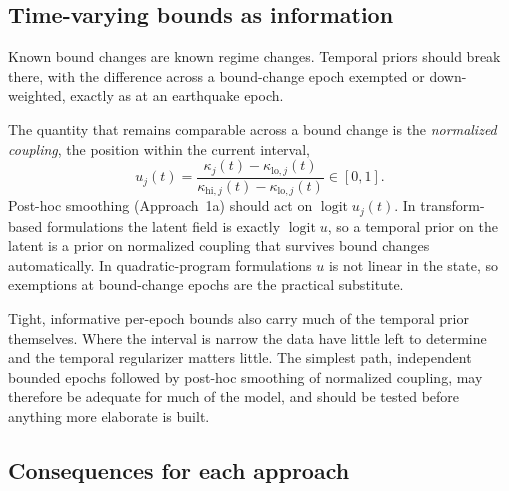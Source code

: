 \documentclass[11pt]{article}
\DeclareMathOperator{\logit}{logit}
\begin{document}
\subsection{Time-varying bounds as information}

Known bound changes are known regime changes. Temporal priors should break there, with the difference across a bound-change epoch exempted or down-weighted, exactly as at an earthquake epoch.

The quantity that remains comparable across a bound change is the \emph{normalized coupling}, the position within the current interval,
\begin{equation}
u_j(t) = \frac{\kappa_j(t) - \kappa_{\mathrm{lo},j}(t)}{\kappa_{\mathrm{hi},j}(t) - \kappa_{\mathrm{lo},j}(t)} \in [0,1].
\label{eq:normalized}
\end{equation}
Post-hoc smoothing (Approach~1a) should act on $\logit u_j(t)$. In transform-based formulations the latent field is exactly $\logit u$, so a temporal prior on the latent is a prior on normalized coupling that survives bound changes automatically. In quadratic-program formulations $u$ is not linear in the state, so exemptions at bound-change epochs are the practical substitute.

Tight, informative per-epoch bounds also carry much of the temporal prior themselves. Where the interval is narrow the data have little left to determine and the temporal regularizer matters little. The simplest path, independent bounded epochs followed by post-hoc smoothing of normalized coupling, may therefore be adequate for much of the model, and should be tested before anything more elaborate is built.

\subsection{Consequences for each approach}
\end{document}
